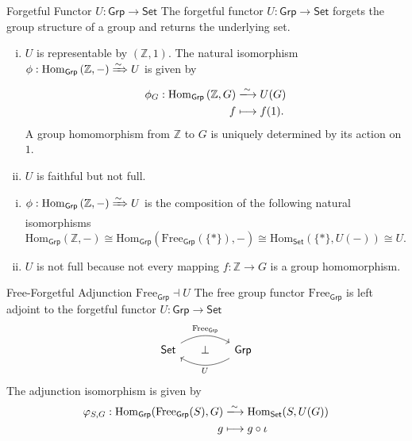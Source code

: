 \begin{example}{Forgetful Functor $U:\mathsf{Grp}\to \mathsf{Set}$}{}
    The forgetful functor $U:\mathsf{Grp}\to \mathsf{Set}$ forgets the group structure of a group and returns the underlying set.
    \begin{enumerate}[(i)]
        \item $U$ is representable by $\left(\mathbb{Z},1\right)$. The natural isomorphism $\phi:\mathrm{Hom}_{\mathsf{Grp}}\left(\mathbb{Z},-\right)\xRightarrow{\sim} U$ is given by
              \begin{align*}
                  \phi_G:\mathrm{Hom}_{\mathsf{Grp}}\left(\mathbb{Z},G\right) & \xlongrightarrow{\sim} U(G) \\
                  f                                                           & \longmapsto f(1).
              \end{align*}
              A group homomorphism from $\mathbb{Z}$ to $G$ is uniquely determined by its action on $1$.
        \item $U$ is faithful but not full.
    \end{enumerate}
\end{example}

\begin{prf}
    \begin{enumerate}[(i)]
        \item $\phi:\mathrm{Hom}_{\mathsf{Grp}}\left(\mathbb{Z},-\right)\xRightarrow{\sim} U$ is the composition of the following natural isomorphisms
              \[
                  \mathrm{Hom}_{\mathsf{Grp}}\left(\mathbb{Z},-\right)\cong\mathrm{Hom}_{\mathsf{Grp}}(\mathrm{Free}_{\mathsf{Grp}}(\{*\}),-)\cong \mathrm{Hom}_{\mathsf{Set}}(\{*\},U(-))\cong U.
              \]
        \item $U$ is not full because not every mapping $f:\mathbb{Z}\to G$ is a group homomorphism.
    \end{enumerate}
\end{prf}


\begin{proposition}{Free-Forgetful Adjunction $\mathrm{Free}_{\mathsf{Grp}}\dashv U$}{}
    The free group functor $\mathrm{Free}_{\mathsf{Grp}}$ is left adjoint to the forgetful functor $U:\mathsf{Grp}\to \mathsf{Set}$
    $$
        \begin{tikzcd}[ampersand replacement=\&]
            \mathsf{Set} \arrow[rr, "\mathrm{Free}_{\mathsf{Grp}}", bend left] \&[-10pt]\bot\&[-10pt] \mathsf{Grp} \arrow[ll, "U", bend left]
        \end{tikzcd}
    $$
    The adjunction isomorphism is given by
    \begin{align*}
        \varphi_{S,G}:\mathrm{Hom}_{\mathsf{Grp}}(\mathrm{Free}_{\mathsf{Grp}}(S),G) & \xlongrightarrow{\sim} \mathrm{Hom}_{\mathsf{Set}}(S,U(G)) \\
        g                                                                            & \longmapsto g\circ \iota
    \end{align*}
\end{proposition}

